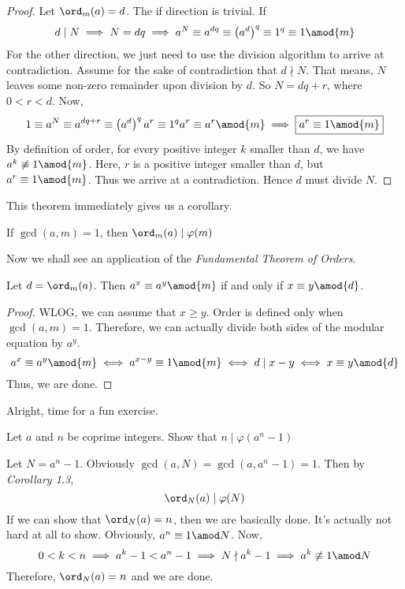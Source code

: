 \documentclass[11pt]{scrartcl}
\begin{document}
\begin{proof}
Let \(\ord_m(a)=d\). The if direction is trivial. If 
\[d \mid N \implies N = dq \implies a^N \equiv a^{dq} \equiv \left(a^d\right)^q \equiv 1^q \equiv 1 \amod{m} \]
For the other direction, we just need to use the division algorithm to arrive at contradiction. Assume for the sake of contradiction that \(d \nmid N\). That means, \(N\) leaves some non-zero remainder upon division by \(d\). So \(N = dq+r\), where \(0<r<d\). Now, 
\[1 \equiv a^N \equiv a^{dq+r} \equiv \left(a^d\right)^q a^r \equiv 1^q a^r\equiv a^r \amod{m} \implies \boxed{a^r \equiv 1 \amod{m}} \]
By definition of order, for every positive integer \(k\) smaller than \(d\), we have \(a^k \not\equiv 1 \amod{m}\). Here, \(r\) is a positive integer smaller than \(d\), but \(a^r \equiv 1 \amod{m}\). Thus we arrive at a contradiction. Hence \(d\) must divide \(N\).
\end{proof}
This theorem immediately gives us a corollary.
\begin{corollary}
If \(\gcd(a,m) = 1\), then \(\ord_m(a) \mid \varphi(m)\)
\end{corollary}
Now we shall see an application of the \textit{Fundamental Theorem of Orders}.
\begin{lemma}
Let \(d= \ord_m(a)\). Then \(a^x \equiv a^y \amod{m}\) if and only if \(x \equiv y \amod{d}\).
\end{lemma}
\begin{proof}
WLOG, we can assume that \(x \geq y\). Order is defined only when \(\gcd(a,m)=1\). Therefore, we can actually divide both sides of the modular equation by \(a^y\).
\[a^x \equiv a^y \amod{m} \iff a^{x-y} \equiv 1 \amod{m} \iff d \mid x-y \iff x \equiv y \amod{d}\]
Thus, we are done.
\end{proof}
Alright, time for a fun exercise.
\begin{exercise}
Let \(a\) and \(n\) be coprime integers. Show that \(n \mid \varphi(a^n - 1)\)
\end{exercise}
\begin{soln}
Let \(N = a^n - 1\). Obviously \(\gcd(a,N) = \gcd(a, a^n - 1) = 1\). Then by \textit{Corollary 1.3}, 
\[\ord_N(a) \mid \varphi(N)\]
If we can show that \(\ord_N(a) = n\), then we are basically done. It's actually not hard at all to show. Obviously, \(a^n \equiv 1 \amod N\). Now,
\[0<k<n \implies a^k - 1 < a^n - 1 \implies N \nmid a^k -1 \implies a^k \not\equiv 1 \amod N\]
Therefore, \(\ord_N(a) = n\) and we are done.
\end{soln}
\pagebreak
\end{document}

